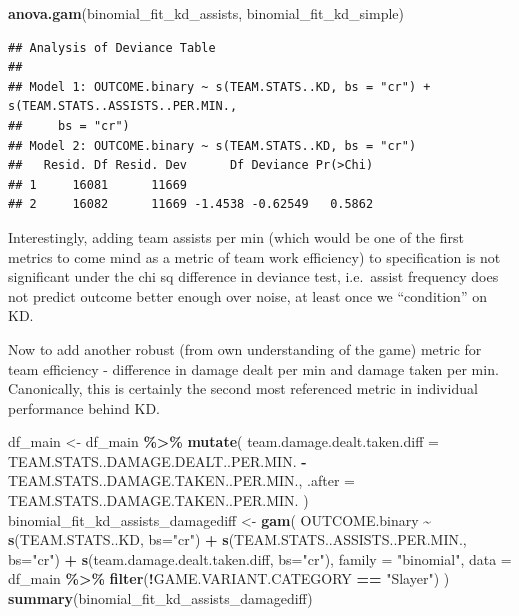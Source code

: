\documentclass[
]{article}
\newenvironment{Shaded}{\begin{snugshade}}{\end{snugshade}}
\newcommand{\AttributeTok}[1]{\textcolor[rgb]{0.13,0.29,0.53}{#1}}
\newcommand{\FunctionTok}[1]{\textcolor[rgb]{0.13,0.29,0.53}{\textbf{#1}}}
\newcommand{\NormalTok}[1]{#1}
\newcommand{\OtherTok}[1]{\textcolor[rgb]{0.56,0.35,0.01}{#1}}
\newcommand{\SpecialCharTok}[1]{\textcolor[rgb]{0.81,0.36,0.00}{\textbf{#1}}}
\newcommand{\StringTok}[1]{\textcolor[rgb]{0.31,0.60,0.02}{#1}}
\begin{document}
\begin{Shaded}
\begin{Highlighting}[]
\FunctionTok{anova.gam}\NormalTok{(binomial\_fit\_kd\_assists, binomial\_fit\_kd\_simple)}
\end{Highlighting}
\end{Shaded}

\begin{verbatim}
## Analysis of Deviance Table
## 
## Model 1: OUTCOME.binary ~ s(TEAM.STATS..KD, bs = "cr") + s(TEAM.STATS..ASSISTS..PER.MIN., 
##     bs = "cr")
## Model 2: OUTCOME.binary ~ s(TEAM.STATS..KD, bs = "cr")
##   Resid. Df Resid. Dev      Df Deviance Pr(>Chi)
## 1     16081      11669                          
## 2     16082      11669 -1.4538 -0.62549   0.5862
\end{verbatim}

Interestingly, adding team assists per min (which would be one of the
first metrics to come mind as a metric of team work efficiency) to
specification is not significant under the chi sq difference in deviance
test, i.e.~assist frequency does not predict outcome better enough over
noise, at least once we ``condition'' on KD.

Now to add another robust (from own understanding of the game) metric
for team efficiency - difference in damage dealt per min and damage
taken per min. Canonically, this is certainly the second most referenced
metric in individual performance behind KD.

\begin{Shaded}
\begin{Highlighting}[]
\NormalTok{df\_main }\OtherTok{\textless{}{-}}\NormalTok{ df\_main }\SpecialCharTok{\%\textgreater{}\%} \FunctionTok{mutate}\NormalTok{(}
  \AttributeTok{team.damage.dealt.taken.diff =}\NormalTok{ TEAM.STATS..DAMAGE.DEALT..PER.MIN. }\SpecialCharTok{{-}}\NormalTok{ TEAM.STATS..DAMAGE.TAKEN..PER.MIN.,}
  \AttributeTok{.after =}\NormalTok{ TEAM.STATS..DAMAGE.TAKEN..PER.MIN.}
\NormalTok{)}
\NormalTok{binomial\_fit\_kd\_assists\_damagediff }\OtherTok{\textless{}{-}} \FunctionTok{gam}\NormalTok{(}
\NormalTok{  OUTCOME.binary }\SpecialCharTok{\textasciitilde{}} \FunctionTok{s}\NormalTok{(TEAM.STATS..KD, }\AttributeTok{bs=}\StringTok{"cr"}\NormalTok{) }\SpecialCharTok{+} \FunctionTok{s}\NormalTok{(TEAM.STATS..ASSISTS..PER.MIN., }\AttributeTok{bs=}\StringTok{"cr"}\NormalTok{) }\SpecialCharTok{+} \FunctionTok{s}\NormalTok{(team.damage.dealt.taken.diff, }\AttributeTok{bs=}\StringTok{"cr"}\NormalTok{),}
  \AttributeTok{family =} \StringTok{"binomial"}\NormalTok{,}
  \AttributeTok{data =}\NormalTok{ df\_main }\SpecialCharTok{\%\textgreater{}\%} 
    \FunctionTok{filter}\NormalTok{(}\SpecialCharTok{!}\NormalTok{GAME.VARIANT.CATEGORY }\SpecialCharTok{==} \StringTok{"Slayer"}\NormalTok{)}
\NormalTok{)}
\FunctionTok{summary}\NormalTok{(binomial\_fit\_kd\_assists\_damagediff)}
\end{Highlighting}
\end{Shaded}
\end{document}
